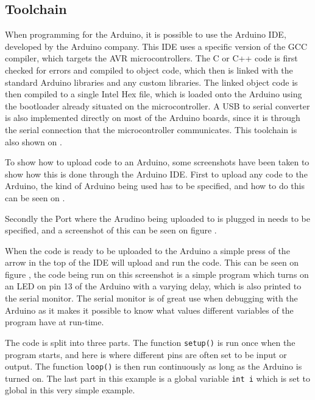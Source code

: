\subsection{Toolchain}
When programming for the Arduino, it is possible to use the Arduino IDE, developed by the Arduino company.
This IDE uses a specific version of the GCC compiler, which targets the AVR microcontrollers.
The C or C++ code is first checked for errors and compiled to object code, which then is linked with the standard Arduino libraries and any custom libraries.
The linked object code is then compiled to a single Intel Hex file, which is loaded onto the Arduino using the bootloader already situated on the microcontroller.
A USB to serial converter is also implemented directly on most of the Arduino boards, since it is through the serial connection that the microcontroller communicates. 
This toolchain is also shown on .\cite{2015ArduinoToolchain}


\noindent
To show how to upload code to an Arduino, some screenshots have been taken to show how this is done through the Arduino IDE.
First to upload any code to the Arduino, the kind of Arduino being used has to be specified, and how to do this can be seen on .

Secondly the Port where the Arudino being uploaded to is plugged in needs to be specified, and a screenshot of this can be seen on figure .

When the code is ready to be uploaded to the Arduino a simple press of the arrow in the top of the IDE will upload and run the code. 
This can be seen on figure , the code being run on this screenshot is a simple program which turns on an LED on pin 13 of the Arduino with a varying delay, which is also printed to the serial monitor.
The serial monitor is of great use when debugging with the Arduino as it makes it possible to know what values different variables of the program have at run-time.

The code is split into three parts.
The function \texttt{setup()} is run once when the program starts, and here is where different pins are often set to be input or output.
The function \texttt{loop()} is then run continuously as long as the Arduino is turned on. 
The last part in this example is a global variable \texttt{int i} which is set to global in this very simple example.

